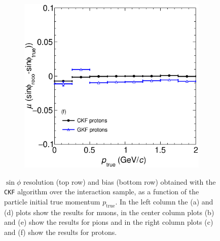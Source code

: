 \begin{figure}[t]
\begin{subfigure}{0.32\textwidth}
         \caption{}
         \label{fig:sinphiBiasVSp211_Int}
     \end{subfigure}
          \begin{subfigure}{0.32\textwidth}
         \centering
         \includegraphics[width=\textwidth]{figures/ch5-KF_NDGAr/FullSample/Int/Angle_Res/sinphi/BiassinphiVSp_2212.eps}
         \caption{}
         \label{fig:sinphiBiasVSp2212_Int}
     \end{subfigure}
        \caption[$\sin\phi$ resolution (top row) and bias (bottom row) obtained with the \texttt{CKF}  algorithm over the interaction sample, as a function of the particle initial true momentum.]{$\sin\phi$ resolution (top row) and bias (bottom row) obtained with the \texttt{CKF}  algorithm over the interaction sample, as a function of the particle initial true momentum $p_\text{true}$. In the left column the (a) and (d) plots show the results for muons, in the center column plots (b) and (e) show the results for pions and in the right column plots (c) and (f) show the results for protons.}
        \label{fig:sinphiRes2Dp_Int}
\end{figure}


